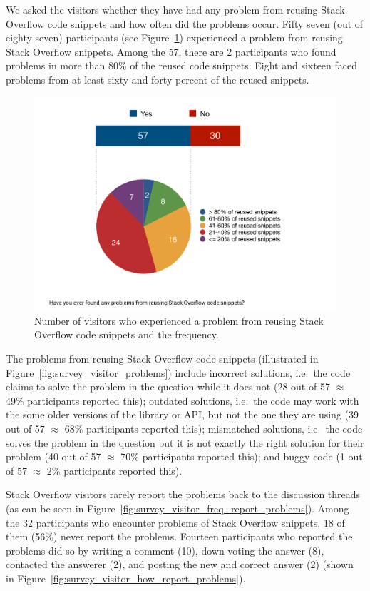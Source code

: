 \documentclass{svjour3}                     %
\begin{document}
We asked the visitors whether they have had any problem from reusing Stack Overflow
code snippets and how often did the problems occur.  Fifty seven (out of eighty
seven) participants (see Figure~\ref{fig:survey_v_problems}) experienced a
problem from reusing Stack Overflow snippets. Among the 57, there are 2
participants who found problems in more than 80\% of the reused code snippets.
Eight and sixteen faced problems from at least sixty and forty percent of the
reused snippets.


\begin{figure} \centering
	\includegraphics[width=.4\linewidth]{survey_v_problems} 
	\caption{Number of visitors who experienced a problem from reusing Stack Overflow code snippets and the frequency.}
	\label{fig:survey_v_problems} 
\end{figure}

The problems from reusing Stack Overflow code snippets (illustrated in
Figure~\ref{fig:survey_visitor_problems}) include incorrect solutions, i.e.~the
code claims to solve the problem in the question while it does not  (28 out of
57 $\approx$ 49\% participants reported this); outdated solutions, i.e.~the code
may work with the some older versions of the library or API, but not the one
they are using (39 out of 57 $\approx$ 68\% participants reported this);
mismatched solutions, i.e.~the code solves the problem in the question but it is
not exactly the right solution for their problem (40 out of 57 $\approx$ 70\%
participants reported this); and buggy code (1 out of 57 $\approx$ 2\%
participants reported this).

Stack Overflow visitors rarely report the problems back to the discussion
threads (as can be seen in
Figure~\ref{fig:survey_visitor_freq_report_problems}). Among the 32 participants
who encounter problems of Stack Overflow snippets, 18 of them (56\%) never
report the problems. Fourteen participants who reported the problems
did so by writing a comment (10), down-voting the answer (8), contacted the
answerer (2), and posting the new and correct answer (2) (shown in
Figure~\ref{fig:survey_visitor_how_report_problems}).
\end{document}
